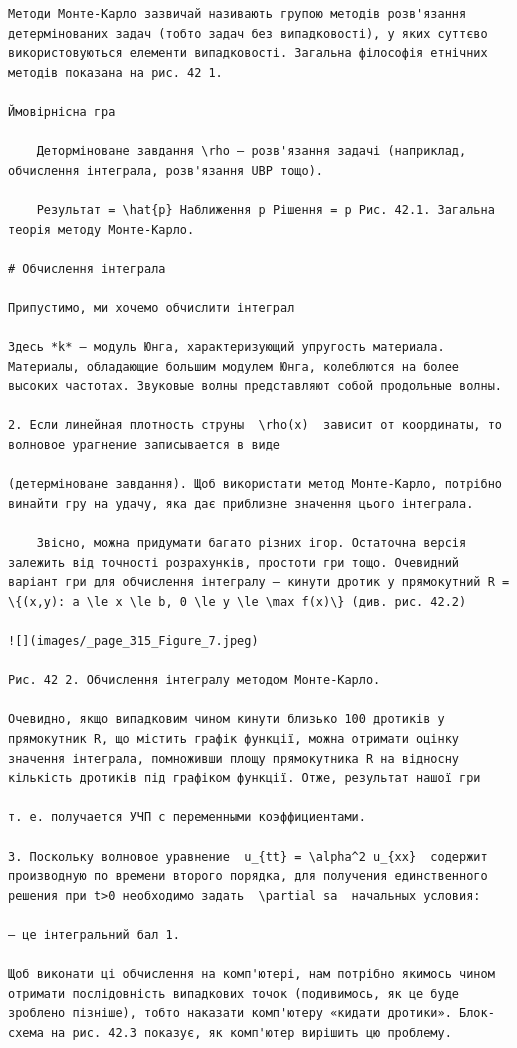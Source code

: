 \documentclass[
  ukrainian,
]{article}
\begin{document}
\begin{verbatim}
Методи Монте-Карло зазвичай називають групою методів розв'язання детермінованих задач (тобто задач без випадковості), у яких суттєво використовуються елементи випадковості. Загальна філософія етнічних методів показана на рис. 42 1.

Ймовірнісна гра

    Деторміноване завдання \rho — розв'язання задачі (наприклад, обчислення інтеграла, розв'язання UBP тощо).

    Результат = \hat{p} Наближення p Рішення = p Рис. 42.1. Загальна теорія методу Монте-Карло.

# Обчислення інтеграла

Припустимо, ми хочемо обчислити інтеграл

Здесь *k* — модуль Юнга, характеризующий упругость материала. Материалы, обладающие большим модулем Юнга, колеблются на более высоких частотах. Звуковые волны представляют собой продольные волны.

2. Если линейная плотность струны  \rho(x)  зависит от координаты, то волновое урагнение записывается в виде

(детерміноване завдання). Щоб використати метод Монте-Карло, потрібно винайти гру на удачу, яка дає приблизне значення цього інтеграла.

    Звісно, можна придумати багато різних ігор. Остаточна версія залежить від точності розрахунків, простоти гри тощо. Очевидний варіант гри для обчислення інтегралу — кинути дротик у прямокутний R = \{(x,y): a \le x \le b, 0 \le y \le \max f(x)\} (див. рис. 42.2)

![](images/_page_315_Figure_7.jpeg)

Рис. 42 2. Обчислення інтегралу методом Монте-Карло.

Очевидно, якщо випадковим чином кинути близько 100 дротиків у прямокутник R, що містить графік функції, можна отримати оцінку значення інтеграла, помноживши площу прямокутника R на відносну кількість дротиків під графіком функції. Отже, результат нашої гри

т. е. получается УЧП с переменными коэффициентами.

3. Поскольку волновое уравнение  u_{tt} = \alpha^2 u_{xx}  содержит производную по времени второго порядка, для получения единственного решения при t>0 необходимо задать  \partial sa  начальных условия:

— це інтегральний бал 1.

Щоб виконати ці обчислення на комп'ютері, нам потрібно якимось чином отримати послідовність випадкових точок (подивимось, як це буде зроблено пізніше), тобто наказати комп'ютеру «кидати дротики». Блок-схема на рис. 42.3 показує, як комп'ютер вирішить цю проблему.


\end{verbatim}
\end{document}
